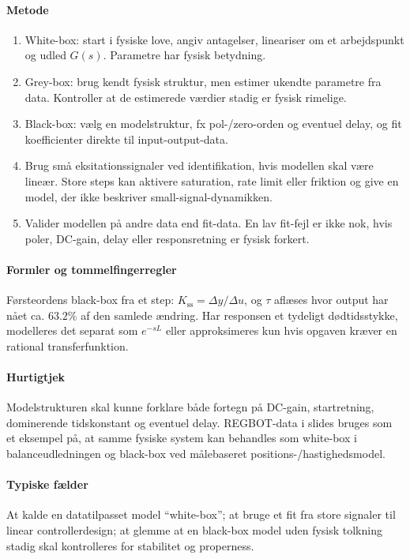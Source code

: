 \paragraph{Metode}
\begin{enumerate}
\item White-box: start i fysiske love, angiv antagelser, lineariser om et arbejdspunkt
      og udled \(G(s)\). Parametre har fysisk betydning.
\item Grey-box: brug kendt fysisk struktur, men estimer ukendte parametre fra data.
      Kontroller at de estimerede værdier stadig er fysisk rimelige.
\item Black-box: vælg en modelstruktur, fx pol-/zero-orden og eventuel delay, og fit
      koefficienter direkte til input-output-data.
\item Brug små eksitationssignaler ved identifikation, hvis modellen skal være lineær.
      Store steps kan aktivere saturation, rate limit eller friktion og give en model,
      der ikke beskriver small-signal-dynamikken.
\item Valider modellen på andre data end fit-data. En lav fit-fejl er ikke nok, hvis
      poler, DC-gain, delay eller responsretning er fysisk forkert.
\end{enumerate}

\paragraph{Formler og tommelfingerregler}
Førsteordens black-box fra et step: \(K_{\mathrm{ss}}=\Delta y/\Delta u\), og
\(\tau\) aflæses hvor output har nået ca. \(63.2\%\) af den samlede ændring. Har
responsen et tydeligt dødtidsstykke, modelleres det separat som \(e^{-sL}\) eller
approksimeres kun hvis opgaven kræver en rational transferfunktion.

\paragraph{Hurtigtjek}
Modelstrukturen skal kunne forklare både fortegn på DC-gain, startretning, dominerende
tidskonstant og eventuel delay. REGBOT-data i slides bruges som et eksempel på, at samme
fysiske system kan behandles som white-box i balanceudledningen og black-box ved
målebaseret positions-/hastighedsmodel.

\paragraph{Typiske fælder}
At kalde en datatilpasset model ``white-box''; at bruge et fit fra store signaler til
linear controllerdesign; at glemme at en black-box model uden fysisk tolkning stadig
skal kontrolleres for stabilitet og properness.

